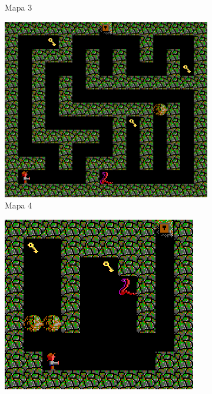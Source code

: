 \documentclass[11pt,spanish]{article}
\begin{document}
\begin{figure}[H]
\begin{subfigure}[b]{0.41\linewidth}
					\caption{Mapa 3}
				\end{subfigure}
				\begin{subfigure}[b]{0.36\linewidth}
					\includegraphics[width=\linewidth]{astar/lab4.png}
					\caption{Mapa 4}
				\end{subfigure}
				\begin{subfigure}[b]{0.24\linewidth}
					\includegraphics[width=\linewidth]{astar/lab5.png}

\end{subfigure}
\end{figure}
\end{document}
